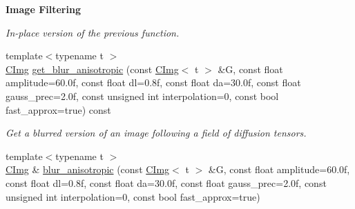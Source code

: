 \begin{Indent}{\bf Image Filtering}
\begin{DoxyCompactItemize}
\begin{DoxyCompactList}\small\item\em In-\/place version of the previous function. \end{DoxyCompactList}\item 
{\footnotesize template$<$typename t $>$ }\\\hyperlink{structcimg__library_1_1_c_img}{C\-Img} \hyperlink{structcimg__library_1_1_c_img_a2d676233cf4d136fb286a0c488a8211d}{get\-\_\-blur\-\_\-anisotropic} (const \hyperlink{structcimg__library_1_1_c_img}{C\-Img}$<$ t $>$ \&G, const float amplitude=60.\-0f, const float dl=0.\-8f, const float da=30.\-0f, const float gauss\-\_\-prec=2.\-0f, const unsigned int interpolation=0, const bool fast\-\_\-approx=true) const 
\begin{DoxyCompactList}\small\item\em Get a blurred version of an image following a field of diffusion tensors. \end{DoxyCompactList}\item 
\hypertarget{structcimg__library_1_1_c_img_a306c987ece8d66ce92d739a828aa82ea}{{\footnotesize template$<$typename t $>$ }\\\hyperlink{structcimg__library_1_1_c_img}{C\-Img} \& \hyperlink{structcimg__library_1_1_c_img_a306c987ece8d66ce92d739a828aa82ea}{blur\-\_\-anisotropic} (const \hyperlink{structcimg__library_1_1_c_img}{C\-Img}$<$ t $>$ \&G, const float amplitude=60.\-0f, const float dl=0.\-8f, const float da=30.\-0f, const float gauss\-\_\-prec=2.\-0f, const unsigned int interpolation=0, const bool fast\-\_\-approx=true)}\label{structcimg__library_1_1_c_img_a306c987ece8d66ce92d739a828aa82ea}


\end{DoxyCompactItemize}
\end{Indent}
